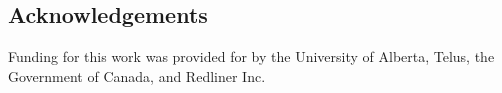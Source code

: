 \documentclass[a0,landscape]{a0poster}
\begin{document}
\begin{multicols*}{3}
\nocite{*} %

\section*{Acknowledgements}
Funding for this work was provided for by the University of Alberta, Telus, the Government of Canada, and Redliner Inc.

\end{multicols*}
\end{document}
